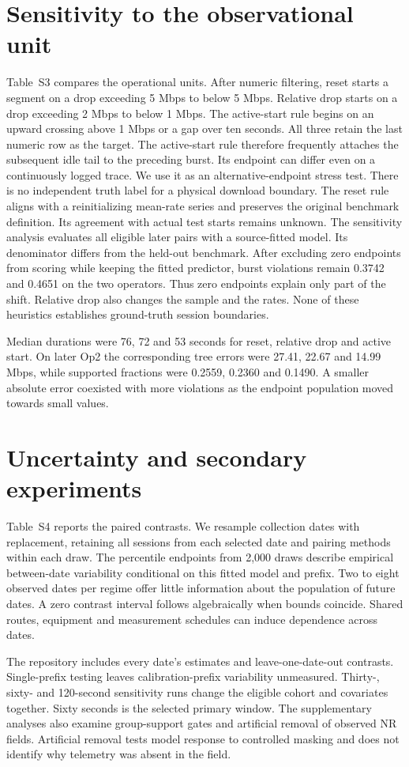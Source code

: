 \documentclass[journal,onecolumn,10pt]{IEEEtran}
\begin{document}
\section{Sensitivity to the observational unit}
Table~S3 compares the operational units. After numeric filtering, reset starts a segment on a drop exceeding 5 Mbps to below 5 Mbps. Relative drop starts on a drop exceeding 2 Mbps to below 1 Mbps. The active-start rule begins on an upward crossing above 1 Mbps or a gap over ten seconds. All three retain the last numeric row as the target. The active-start rule therefore frequently attaches the subsequent idle tail to the preceding burst. Its endpoint can differ even on a continuously logged trace. We use it as an alternative-endpoint stress test. There is no independent truth label for a physical download boundary. The reset rule aligns with a reinitializing mean-rate series and preserves the original benchmark definition. Its agreement with actual test starts remains unknown. The sensitivity analysis evaluates all eligible later pairs with a source-fitted model. Its denominator differs from the held-out benchmark. After excluding zero endpoints from scoring while keeping the fitted predictor, burst violations remain 0.3742 and 0.4651 on the two operators. Thus zero endpoints explain only part of the shift. Relative drop also changes the sample and the rates. None of these heuristics establishes ground-truth session boundaries.

Median durations were 76, 72 and 53 seconds for reset, relative drop and active start. On later Op2 the corresponding tree errors were 27.41, 22.67 and 14.99 Mbps, while supported fractions were 0.2559, 0.2360 and 0.1490. A smaller absolute error coexisted with more violations as the endpoint population moved towards small values.

\section{Uncertainty and secondary experiments}
Table~S4 reports the paired contrasts. We resample collection dates with replacement, retaining all sessions from each selected date and pairing methods within each draw. The percentile endpoints from 2,000 draws describe empirical between-date variability conditional on this fitted model and prefix. Two to eight observed dates per regime offer little information about the population of future dates. A zero contrast interval follows algebraically when bounds coincide. Shared routes, equipment and measurement schedules can induce dependence across dates.

The repository includes every date's estimates and leave-one-date-out contrasts. Single-prefix testing leaves calibration-prefix variability unmeasured. Thirty-, sixty- and 120-second sensitivity runs change the eligible cohort and covariates together. Sixty seconds is the selected primary window. The supplementary analyses also examine group-support gates and artificial removal of observed NR fields. Artificial removal tests model response to controlled masking and does not identify why telemetry was absent in the field.
\end{document}
